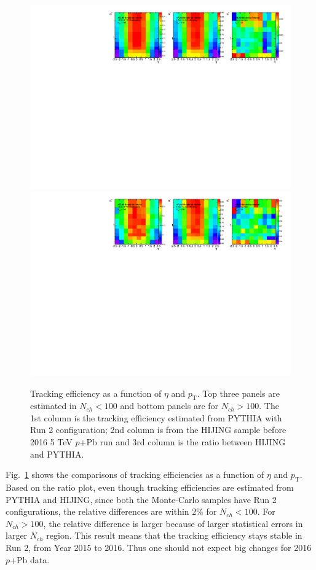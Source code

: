 \begin{figure}[H]
\centering
\includegraphics[width=0.9\linewidth]{figs/sec_evtSlc/MC_pPb5_ev1_Nch0.pdf}
\includegraphics[width=0.9\linewidth]{figs/sec_evtSlc/MC_pPb5_ev1_Nch1.pdf}
\caption{Tracking efficiency as a function of $\eta$ and $p_{\text{T}}$. Top three panels are estimated in $N_{ch}<100$ and bottom panels are for $N_{ch}>100$. The 1st column is the tracking efficiency estimated from PYTHIA with Run 2 configuration; 2nd column is from the HIJING sample before 2016 5 TeV $p$+Pb run and 3rd column is the ratio between HIJING and PYTHIA.}
\label{fig:MC_pPb5_ev1}
\end{figure}
Fig.~\ref{fig:MC_pPb5_ev1} shows the comparisons of tracking efficiencies as a function of $\eta$ and $p_{\text{T}}$. Based on the ratio plot, even though tracking efficiencies are estimated from PYTHIA and HIJING, since both the Monte-Carlo samples have Run 2 configurations, the relative differences are within $2\%$ for $N_{ch}<100$. For $N_{ch}>100$, the relative difference is larger because of larger statistical errors in larger $N_{ch}$ region. This result means that the tracking efficiency stays stable in Run 2, from Year 2015 to 2016. Thus one should not expect big changes for 2016 $p$+Pb data.

